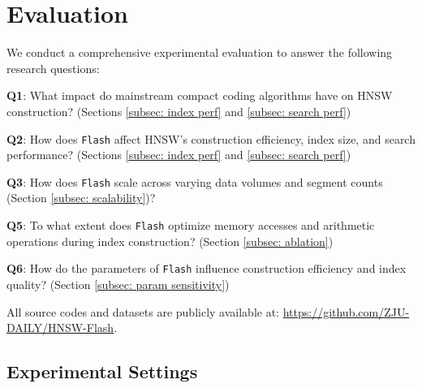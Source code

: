 \setlength{\textfloatsep}{12pt plus 2pt minus 2pt}
\section{Evaluation}
\label{sec: experiments}
We conduct a comprehensive experimental evaluation to answer the following research questions:

\noindent\textbf{Q1}: What impact do mainstream compact coding algorithms have on HNSW construction? (Sections \ref{subsec: index perf} and \ref{subsec: search perf})

\noindent\textbf{Q2}: How does \texttt{Flash} affect HNSW's construction efficiency, index size, and search performance? (Sections \ref{subsec: index perf} and \ref{subsec: search perf})

\noindent\textbf{Q3}: How does \texttt{Flash} scale across varying data volumes and segment counts (Section \ref{subsec: scalability})?



\noindent\textbf{Q5}: To what extent does \texttt{Flash} optimize memory accesses and arithmetic operations during index construction? (Section \ref{subsec: ablation})

\noindent\textbf{Q6}: How do the parameters of \texttt{Flash} influence construction efficiency and index quality? (Section \ref{subsec: param sensitivity})

All source codes and datasets are publicly available at: \url{https://github.com/ZJU-DAILY/HNSW-Flash}.

\subsection{Experimental Settings}

